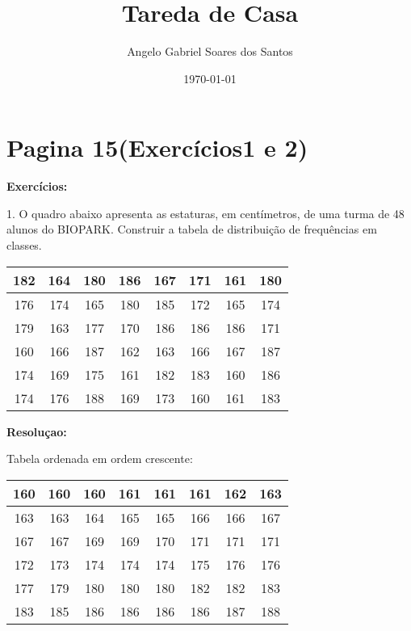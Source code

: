 \documentclass[12pt]{article}%
\title{Tareda de Casa }
\author{Angelo Gabriel Soares dos Santos}
\date{\today}
\begin{document}
\maketitle
\section{Pagina 15(Exercícios1 e  2)}
\textbf{Exercícios:}

1. O quadro abaixo apresenta as estaturas, em centímetros, de uma turma de 48 alunos do BIOPARK. Construir a tabela de distribuição de frequências em classes.

\begin{center}
\begin{tabular}{|c|c|c|c|c|c|c|c|}
\hline
182 & 164 & 180 & 186 & 167 & 171 & 161 & 180 \\ \hline
176 & 174 & 165 & 180 & 185 & 172 & 165 & 174 \\ \hline
179 & 163 & 177 & 170 & 186 & 186 & 186 & 171 \\ \hline
160 & 166 & 187 & 162 & 163 & 166 & 167 & 187 \\ \hline
174 & 169 & 175 & 161 & 182 & 183 & 160 & 186 \\ \hline
174 & 176 & 188 & 169 & 173 & 160 & 161 & 183  \\ \hline
\end{tabular}
\end{center}
\color[rgb]{0.8,0.2,0.2}

\textbf{Resoluçao:}
\color[rgb]{0.2,0.2,0.2}

Tabela ordenada em ordem crescente:
\begin{center}
\begin{tabular}{|c|c|c|c|c|c|c|c|}
\hline
160 & 160 & 160 & 161 & 161 & 161 & 162 & 163 \\ \hline
163 & 163 & 164 & 165 & 165 & 166 & 166 & 167 \\ \hline
167 & 167 & 169 & 169 & 170 & 171 & 171 & 171 \\ \hline
172 & 173 & 174 & 174 & 174 & 175 & 176 & 176 \\ \hline
177 & 179 & 180 & 180 & 180 & 182 & 182 & 183 \\ \hline
183 & 185 & 186 & 186 & 186 & 186 & 187 & 188 \\ \hline
\end{tabular}
\end{center}
\end{document}
